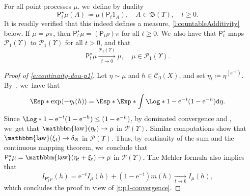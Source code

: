 \documentclass[10pt]{amsart}
\theoremstyle{definition}
\theoremstyle{remark}
\DeclareMathOperator{\law}{\mathbbm{law}}
\begin{document}
For all point processes $\mu$, we~define by duality
\begin{equation*}
\mathsf{P}^{\star}_{t} \mu(A) \coloneq \mu(\mathsf{P}_{t}1_{A}), \quad A \in \mathfrak{B}(\varUpsilon),\quad t \ge 0.
\end{equation*}
It is readily verified that this indeed defines a measure, \cf \cref{l:countableAdditivity} below.
If $\mu = \rho \pi$, then $\mathsf{P}^{\star}_{t}\mu = (\mathsf{P}_{t} \rho) \pi$ for all $t \ge 0$. We~also have that $\mathsf{P}^{\star}_{t}$ maps $\mathscr{P}_{1}(\varUpsilon)$ to $\mathscr{P}_{1}(\varUpsilon)$ for all $t > 0$, and that
\begin{equation}\label{e:continuity-dou-p1}
\mathsf{P}^{\star}_{t}\mu \xrightarrow[t \to 0]{\mathscr{P}_{1}(\varUpsilon)} \mu, \quad \mu \in \mathscr{P}_{1}(\varUpsilon).
\end{equation}
\begin{proof}[Proof of \cref{e:continuity-dou-p1}]
Let $\eta \sim \mu$ and $h \in \mathscr{C}_{0}(X)$, and set $\eta_{t} \coloneq \eta^{(\mathrm{e}^{-t})}$.
By~\cite[Lem.\,3.1]{Kallenberg}, we~have that
\begin{equation}\label{e:LaplaceThinning}
\Esp*{ \exp(-\eta_{t}(h)) } = \Esp*{ \Exp*{ \int \Log*{1 - \mathrm{e}^{-t}(1 - \mathrm{e}^{-h})} \mathtt{d} \eta } }.
\end{equation}
Since $\Log*{ 1 - \mathrm{e}^{-t}(1 - \mathrm{e}^{-h}) } \leq (1-\mathrm{e}^{-h})$, by dominated convergence and \cite[Th.\,4.11]{Kallenberg}, we~get that $\law(\eta_{t}) \to \mu$ in $\mathscr{P}(\varUpsilon)$.
Similar computations show that $\law(\xi_{t}) \to \delta_{\varnothing}$ in $\mathscr{P}(\varUpsilon)$.
Thus, by continuity of the sum and the continuous mapping theorem, we~conclude that $\mathsf{P}^{\star}_{t}\mu = \law(\eta_{t} + \xi_{t}) \to \mu$ in $\mathscr{P}(\varUpsilon)$.
The Mehler formula also implies that
\begin{equation}\label{e:intensity-Ornstein-Uhlenbeck}
I_{\mathsf{P}^{\star}_{t}\mu}(h) = \mathrm{e}^{-t} I_{\mu}(h) + (1-\mathrm{e}^{-t}) m(h) \xrightarrow[t \to 0]{} I_{\mu}(h),
\end{equation}
which concludes the proof in view of \cref{t:p1-convergence}.
\end{proof}
\end{document}
